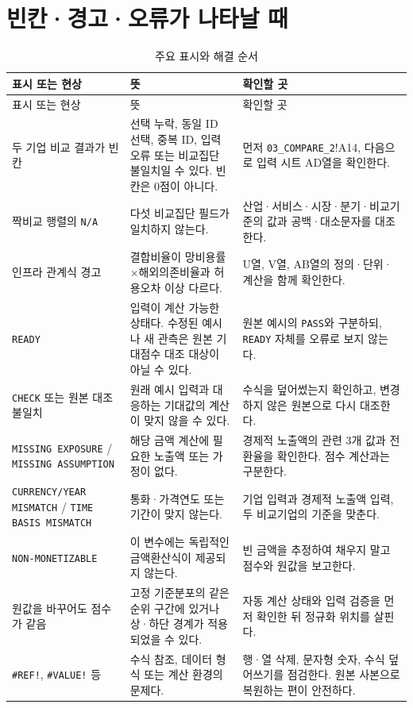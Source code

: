 \clearpage
\section{빈칸·경고·오류가 나타날 때}

\begin{longtable}{@{}L{4.2cm}L{5.0cm}L{5.5cm}@{}}
\caption{주요 표시와 해결 순서}\label{tab:simulator-troubleshooting}\\
\toprule
{}
표시 또는 현상 & 뜻 & 확인할 곳 \\
\midrule
\endfirsthead
\toprule
{}
표시 또는 현상 & 뜻 & 확인할 곳 \\
\midrule
\endhead
\bottomrule
\endfoot
두 기업 비교 결과가 빈칸 & 선택 누락, 동일 ID 선택, 중복 ID, 입력 오류 또는 비교집단 불일치일 수 있다. 빈칸은 0점이 아니다. & 먼저 \nolinkurl{03_COMPARE_2}!A14, 다음으로 입력 시트 AD열을 확인한다. \\
짝비교 행렬의 \texttt{N/A} & 다섯 비교집단 필드가 일치하지 않는다. & 산업·서비스·시장·분기·비교기준의 값과 공백·대소문자를 대조한다. \\
인프라 관계식 경고 & 결합비율이 망비용률\(\times\)해외의존비율과 허용오차 이상 다르다. & U열, V열, AB열의 정의·단위·계산을 함께 확인한다. \\
\texttt{READY} & 입력이 계산 가능한 상태다. 수정된 예시나 새 관측은 원본 기대점수 대조 대상이 아닐 수 있다. & 원본 예시의 \texttt{PASS}와 구분하되, \texttt{READY} 자체를 오류로 보지 않는다. \\
\texttt{CHECK} 또는 원본 대조 불일치 & 원래 예시 입력과 대응하는 기대값의 계산이 맞지 않을 수 있다. & 수식을 덮어썼는지 확인하고, 변경하지 않은 원본으로 다시 대조한다. \\
\texttt{MISSING EXPOSURE} / \texttt{MISSING ASSUMPTION} & 해당 금액 계산에 필요한 노출액 또는 가정이 없다. & 경제적 노출액의 관련 3개 값과 전환율을 확인한다. 점수 계산과는 구분한다. \\
\texttt{CURRENCY/YEAR MISMATCH} / \texttt{TIME BASIS MISMATCH} & 통화·가격연도 또는 기간이 맞지 않는다. & 기업 입력과 경제적 노출액 입력, 두 비교기업의 기준을 맞춘다. \\
\texttt{NON-MONETIZABLE} & 이 변수에는 독립적인 금액환산식이 제공되지 않는다. & 빈 금액을 추정하여 채우지 말고 점수와 원값을 보고한다. \\
원값을 바꾸어도 점수가 같음 & 고정 기준분포의 같은 순위 구간에 있거나 상·하단 경계가 적용되었을 수 있다. & 자동 계산 상태와 입력 검증을 먼저 확인한 뒤 정규화 위치를 살핀다. \\
\texttt{\#REF!}, \texttt{\#VALUE!} 등 & 수식 참조, 데이터 형식 또는 계산 환경의 문제다. & 행·열 삭제, 문자형 숫자, 수식 덮어쓰기를 점검한다. 원본 사본으로 복원하는 편이 안전하다. \\
\end{longtable}

